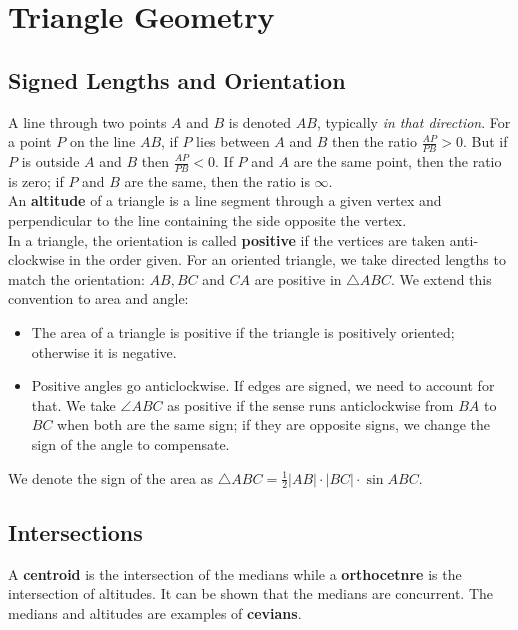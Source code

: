 \section{Triangle Geometry}

\subsection{Signed Lengths and Orientation}

A line through two points \(A\) and \(B\) is denoted \(AB\), typically \textit{in that direction}. For a point \(P\) on the line \(AB\), if \(P\) lies between \(A\) and \(B\) then the ratio \(\frac{AP}{PB} > 0\). But if \(P\) is outside \(A\) and \(B\) then \(\frac{AP}{PB} < 0\). If \(P\) and \(A\) are the same point, then the ratio is zero; if \(P\) and \(B\) are the same, then the ratio is \(\infty\). \\

An \textbf{altitude} of a triangle is a line segment through a given vertex and perpendicular to the line containing the side opposite the vertex. \\

In a triangle, the orientation is called \textbf{positive} if the vertices are taken anti-clockwise in the order given. For an oriented triangle, we take directed lengths to match the orientation: \(AB, BC\) and \(CA\) are positive in \(\triangle ABC\). We extend this convention to area and angle:
\begin{itemize}
    \item The area of a triangle is positive if the triangle is positively oriented; otherwise it is negative.
    \item Positive angles go anticlockwise. If edges are signed, we need to account for that. We take \(\angle ABC\) as positive if the sense runs anticlockwise from \(BA\) to \(BC\) when both are the same sign; if they are opposite signs, we change the sign of the angle to compensate.
\end{itemize}

We denote the sign of the area as \(\triangle ABC = \frac{1}{2} |AB| \cdot |BC| \cdot \sin ABC\).

\subsection{Intersections}

A \textbf{centroid} is the intersection of the medians while a \textbf{orthocetnre} is the intersection of altitudes. It can be shown that the medians are concurrent. The medians and altitudes are examples of \textbf{cevians}.

